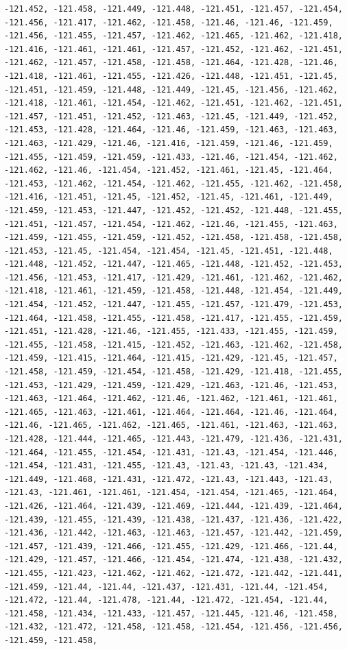 \documentclass[
]{article}
\begin{document}
\begin{verbatim}
-121.452, -121.458, -121.449, -121.448, -121.451, -121.457, -121.454,  -121.456, -121.417, -121.462, -121.458, -121.46, -121.46, -121.459,  -121.456, -121.455, -121.457, -121.462, -121.465, -121.462, -121.418,  -121.416, -121.461, -121.461, -121.457, -121.452, -121.462, -121.451,  -121.462, -121.457, -121.458, -121.458, -121.464, -121.428, -121.46,  -121.418, -121.461, -121.455, -121.426, -121.448, -121.451, -121.45,  -121.451, -121.459, -121.448, -121.449, -121.45, -121.456, -121.462,  -121.418, -121.461, -121.454, -121.462, -121.451, -121.462, -121.451,  -121.457, -121.451, -121.452, -121.463, -121.45, -121.449, -121.452,  -121.453, -121.428, -121.464, -121.46, -121.459, -121.463, -121.463,  -121.463, -121.429, -121.46, -121.416, -121.459, -121.46, -121.459,  -121.455, -121.459, -121.459, -121.433, -121.46, -121.454, -121.462,  -121.462, -121.46, -121.454, -121.452, -121.461, -121.45, -121.464,  -121.453, -121.462, -121.454, -121.462, -121.455, -121.462, -121.458,  -121.416, -121.451, -121.45, -121.452, -121.45, -121.461, -121.449,  -121.459, -121.453, -121.447, -121.452, -121.452, -121.448, -121.455,  -121.451, -121.457, -121.454, -121.462, -121.46, -121.455, -121.463,  -121.459, -121.455, -121.459, -121.452, -121.458, -121.458, -121.458,  -121.453, -121.45, -121.454, -121.454, -121.45, -121.451, -121.448,  -121.448, -121.452, -121.447, -121.465, -121.448, -121.452, -121.453,  -121.456, -121.453, -121.417, -121.429, -121.461, -121.462, -121.462,  -121.418, -121.461, -121.459, -121.458, -121.448, -121.454, -121.449,  -121.454, -121.452, -121.447, -121.455, -121.457, -121.479, -121.453,  -121.464, -121.458, -121.455, -121.458, -121.417, -121.455, -121.459,  -121.451, -121.428, -121.46, -121.455, -121.433, -121.455, -121.459,  -121.455, -121.458, -121.415, -121.452, -121.463, -121.462, -121.458,  -121.459, -121.415, -121.464, -121.415, -121.429, -121.45, -121.457,  -121.458, -121.459, -121.454, -121.458, -121.429, -121.418, -121.455,  -121.453, -121.429, -121.459, -121.429, -121.463, -121.46, -121.453,  -121.463, -121.464, -121.462, -121.46, -121.462, -121.461, -121.461,  -121.465, -121.463, -121.461, -121.464, -121.464, -121.46, -121.464,  -121.46, -121.465, -121.462, -121.465, -121.461, -121.463, -121.463,  -121.428, -121.444, -121.465, -121.443, -121.479, -121.436, -121.431,  -121.464, -121.455, -121.454, -121.431, -121.43, -121.454, -121.446,  -121.454, -121.431, -121.455, -121.43, -121.43, -121.43, -121.434,  -121.449, -121.468, -121.431, -121.472, -121.43, -121.443, -121.43,  -121.43, -121.461, -121.461, -121.454, -121.454, -121.465, -121.464,  -121.426, -121.464, -121.439, -121.469, -121.444, -121.439, -121.464,  -121.439, -121.455, -121.439, -121.438, -121.437, -121.436, -121.422,  -121.436, -121.442, -121.463, -121.463, -121.457, -121.442, -121.459,  -121.457, -121.439, -121.466, -121.455, -121.429, -121.466, -121.44,  -121.429, -121.457, -121.466, -121.454, -121.474, -121.438, -121.432,  -121.455, -121.423, -121.462, -121.462, -121.472, -121.442, -121.441,  -121.459, -121.44, -121.44, -121.437, -121.431, -121.44, -121.454,  -121.472, -121.44, -121.478, -121.44, -121.472, -121.454, -121.44,  -121.458, -121.434, -121.433, -121.457, -121.445, -121.46, -121.458,  -121.432, -121.472, -121.458, -121.458, -121.454, -121.456, -121.456,  -121.459, -121.458, 
\end{verbatim}
\end{document}
